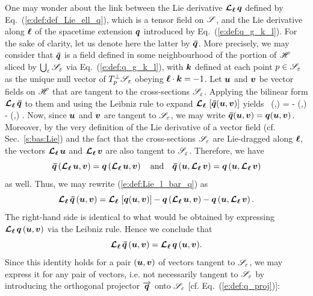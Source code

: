One may wonder about the link between the Lie derivative $\bm{\mathcal{L}}_{\bm{\ell}}\, \bm{q}$ defined
by Eq.~(\ref{e:def:def_Lie_ell_q}), which is a tensor field on $\mathscr{S}$,
and the Lie derivative along $\bm{\ell}$ of the spacetime extension $\bm{q}$ introduced by
Eq.~(\ref{e:def:q_g_k_l}). For the sake of clarity, let us denote here the latter
by $\bm{\bar q}$. More precisely, we may consider that $\bm{\bar q}$ is a
field defined in some neighbourhood of the portion of $\mathscr{H}$ sliced by
$\bigcup_{\varepsilon} \mathscr{S}_\varepsilon$ via Eq.~(\ref{e:def:q_g_k_l}), with $\bm{k}$
defined at each point $p\in\mathscr{S}_\varepsilon$ as the unique null vector of
$T_p^\perp\mathscr{S}_\varepsilon$ obeying $\bm{\ell}\cdot\bm{k}=-1$.
Let $\bm{u}$ and $\bm{v}$ be vector fields on $\mathscr{H}$ that are tangent
to the cross-sections $\mathscr{S}_\varepsilon$. Applying the bilinear form
$\bm{\mathcal{L}}_{\bm{\ell}}\,\bm{\bar q}$ to them and using the Leibniz rule to expand
$\bm{\mathcal{L}}_{\bm{\ell}}\, \left[ \bm{\bar q}(\bm{u},\bm{v}) \right]$ yields
\be \label{e:def:Lie_l_bar_q}
     \Lie{\el}  \, (,) = \Lie{\el} 
        - \left(\Lie{\el},\right)
         - \left(,\Lie{\el}\right) .
\ee
Now, since $\bm{u}$ and $\bm{v}$ are tangent to $\mathscr{S}_\varepsilon$, we may
write $\bm{\bar q}(\bm{u},\bm{v}) = \bm{q}(\bm{u},\bm{v})$. Moreover, by the very
definition of the Lie derivative of a vector field (cf. Sec.~\ref{s:bas:Lie})
and the fact that the cross-sections
$\mathscr{S}_\varepsilon$ are Lie-dragged along $\bm{\ell}$, the vectors
$\bm{\mathcal{L}}_{\bm{\ell}}\,\bm{u}$ and $\bm{\mathcal{L}}_{\bm{\ell}}\,\bm{v}$ are also tangent to $\mathscr{S}_\varepsilon$.
Therefore, we have
\[
    \bm{\bar q}\left(\bm{\mathcal{L}}_{\bm{\ell}}\,\bm{u},\bm{v}\right) = \bm{q} \left(\bm{\mathcal{L}}_{\bm{\ell}}\,\bm{u},\bm{v}\right)
    \quad\mbox{and}\quad
    \bm{\bar q}\left(\bm{u},\bm{\mathcal{L}}_{\bm{\ell}}\,\bm{v}\right) = \bm{q}\left(\bm{u},\bm{\mathcal{L}}_{\bm{\ell}}\,\bm{v}\right)
\]
as well. Thus, we may rewrite (\ref{e:def:Lie_l_bar_q}) as
\[
     \bm{\mathcal{L}}_{\bm{\ell}}\, \bm{\bar q} \, (\bm{u},\bm{v}) = \bm{\mathcal{L}}_{\bm{\ell}}\, \left[ \bm{q}(\bm{u},\bm{v}) \right]
        - \bm{q}\left(\bm{\mathcal{L}}_{\bm{\ell}}\,\bm{u},\bm{v}\right)
         - \bm{q}\left(\bm{u},\bm{\mathcal{L}}_{\bm{\ell}}\,\bm{v}\right) .
\]
The right-hand side is identical to what would be obtained by expressing
$\bm{\mathcal{L}}_{\bm{\ell}}\, \bm{q} \, (\bm{u},\bm{v})$ via the Leibniz rule. Hence we conclude
that
\[
    \bm{\mathcal{L}}_{\bm{\ell}}\, \bm{\bar q} \, (\bm{u},\bm{v}) = \bm{\mathcal{L}}_{\bm{\ell}}\, \bm{q} \, (\bm{u},\bm{v}) .
\]
Since this identity holds for a pair $(\bm{u},\bm{v})$ of vectors tangent
to $\mathscr{S}_\varepsilon$, we may express it for any pair of vectors, i.e. not
necessarily tangent to $\mathscr{S}_\varepsilon$ by introducing the orthogonal
projector $\overrightarrow{\bm{q}}$ onto $\mathscr{S}_\varepsilon$ [cf. Eq.~(\ref{e:def:q_proj})]:
\be \label{e:def:Lie_ell_bar_q}
